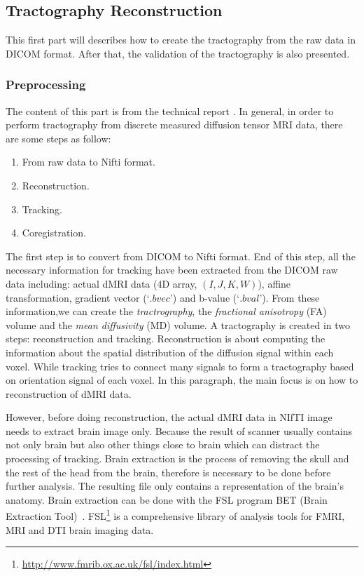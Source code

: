\subsection{Tractography Reconstruction}
\label{subsec:experiments_reconstruction}
This first part will describes how to create the tractography from the raw data in DICOM format. After that, the validation of the tractography is also presented.
\subsubsection{Preprocessing}
The content of this part is from the technical report \cite{bao2012dmri}. In general, in order to perform tractography from discrete measured diffusion tensor MRI data, there are some steps as follow:

\begin{enumerate}
\item From raw data to Nifti format.
\item Reconstruction.
\item Tracking.
\item Coregistration.
\end{enumerate}

The first step is to convert from DICOM to Nifti format. End of this step, all the necessary information for tracking have been extracted from the DICOM raw data including: actual dMRI data (4D array, $(I,J,K,W)$), affine transformation, gradient vector ($‘.bvec’$) and b-value ($‘.bval’$).
From these information,we can create the \emph{tractrography}, the \emph{fractional anisotropy} (FA) volume and the \emph{mean diffusivity} (MD) volume.
A tractography is created in two steps: reconstruction and tracking. Reconstruction is about computing the information about the spatial distribution of the diffusion signal within each voxel. While tracking tries to connect many signals to form a tractography based on orientation signal of each voxel. In this paragraph, the main focus is on how to reconstruction of dMRI data.   

However, before doing reconstruction, the actual dMRI data in NIfTI image needs to extract brain image only. Because the result of scanner usually contains not only brain but also other things close to brain which can distract the processing of tracking. Brain extraction is the process of removing the skull and the rest of the head from the brain, therefore is necessary to be done before further analysis. The resulting file only contains a representation of the brain's anatomy. Brain extraction can be done with the FSL program BET (Brain Extraction Tool)~\cite{smith2002automated}. FSL\footnote{\url{http://www.fmrib.ox.ac.uk/fsl/index.html}} is a comprehensive library of analysis tools for FMRI, MRI and DTI brain imaging data.

